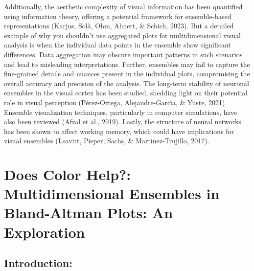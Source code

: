 \documentclass[print]{nuthesis}
\begin{document}
Additionally, the aesthetic complexity of visual information has been quantified using information theory, offering a potential framework for ensemble-based representations (Karjus, Solà, Ohm, Ahnert, \& Schich, 2023).
But a detailed example of why you shouldn't use aggregated plots for multidimensional visual analysis is when the individual data points in the ensemble show significant differences. Data aggregation may obscure important patterns in such scenarios and lead to misleading interpretations.
Further, ensembles may fail to capture the fine-grained details and nuances present in the individual plots, compromising the overall accuracy and precision of the analysis.
The long-term stability of neuronal ensembles in the visual cortex has been studied, shedding light on their potential role in visual perception (Pérez-Ortega, Alejandre-Garcı́a, \& Yuste, 2021).
Ensemble visualization techniques, particularly in computer simulations, have also been reviewed (Afzal et al., 2019).
Lastly, the structure of neural networks has been shown to affect working memory, which could have implications for visual ensembles (Leavitt, Pieper, Sachs, \& Martinez-Trujillo, 2017).

\hypertarget{ref-labels}{%
\chapter{Does Color Help?: Multidimensional Ensembles in Bland-Altman Plots: An Exploration}\label{ref-labels}}

\hypertarget{introduction-3}{%
\section{Introduction:}\label{introduction-3}}
\end{document}
